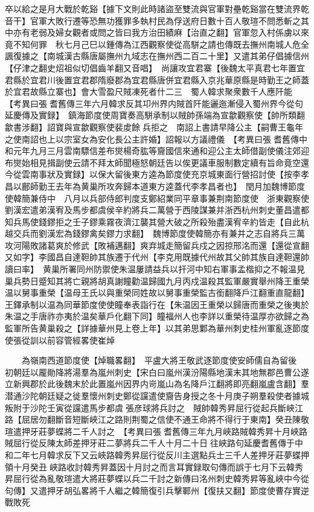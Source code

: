 卒以給之是月大戰於乾谿【據下文則此時諸盜至雙流與官軍對壘乾谿當在雙流界乾音干】官軍大敗行遷等恐無功獲罪多執村民為俘送府日數十百人敬瑄不問悉斬之其中亦有老弱及婦女觀者或問之皆曰我方治田績麻【治直之翻】官軍忽入村係虜以來竟不知何罪　秋七月己巳以鍾傳為江西觀察使從高駢之請也傳既去撫州南城人危全諷復據之【南城漢古縣唐屬撫州九域志在撫州西二百二十里】又遣其弟仔倡據信州【仔津之翻史炤祖似切倡齒羊翻又音唱】　尚讓攻宜君寨【後魏太平真君七年置宜君縣於宜君川後置宜君郡隋廢郡為宜君縣唐併宜君縣入京兆華原縣是時勤王之師蓋於宜君故縣立寨也】會大雪盈尺賊凍死者什二三　蜀人韓求聚衆數千人應阡能　【考異曰張耆舊傳三年六月韓求反其卭州界内賊首阡能邐迤漸侵入蜀州界今從句延慶傳及實録】　鎮海節度使周寶奏高駢承制以賊帥孫端為宣歙觀察使【帥所類翻歙書涉翻】詔寶與宣歙觀察使裴䖍餘兵拒之　南詔上書請早降公主【嗣曹王龜年之使南詔也上以宗室女為安化長公主許婚】詔報以方議禮儀　【考異曰張耆舊傳中和元年九月三月雲南驃信差布爕楊奇肱等齎國信來通和迎公主太師借副使儀注郊迎布爕始相見揖副使云請不拜太師聞極怒朝廷告以俟更議車服制數定續有旨命竟空還今從雲南事狀及實録】以保大留後東方逵為節度使充京城東面行營招討使【按李孝昌以鄜師勤王去年為黄巢所攻奔歸本道東方逵蓋代李孝昌者也】　閏月加魏博節度使韓簡兼侍中　八月以兵部侍郎判度支鄭紹業同平章事兼荆南節度使　浙東觀察使劉漢宏遣弟漢宥及馬步都虞侯辛約將兵二萬營于西陵謀兼并浙西杭州刺史董昌遣都知兵馬使錢鏐拒之壬子鏐乘霧夜濟江襲其營大破之所殺殆盡漢宥辛約皆走【自此杭越交兵而劉漢宏為錢鏐禽矣鏐力求翻】　魏博節度使韓簡亦有兼并之志自將兵三萬攻河陽敗諸葛爽於修武【敗補邁翻】爽弃城走簡留兵戍之因掠邢洺而還【還從宣翻又如字】李國昌自達靼帥其族遷于代州【李克用既據代州故其父帥其族自達靼還帥讀曰率】　黄巢所署同州防禦使朱温屢請益兵以扞河中知右軍事孟楷抑之不報温見巢兵勢日蹙知其將亡親將胡真謝瞳勸温歸國九月丙戍温殺其監軍嚴實舉州降王重榮温以舅事重榮【温母王氏以與重榮同姓故以舅事重榮監古銜翻降戶江翻重直龍翻】王鐸承制以温為同華節度使使瞳奉表詣行在【朱温因王重榮以歸唐而重榮之後夷於朱温之手唐祚亦夷於温矣華戶化翻下同】瞳福州人也李詳以重榮待温厚亦欲歸之為監軍所告黄巢殺之【詳據華州見上卷上年】以其弟思鄴為華州刺史桂州軍亂逐節度使張從訓以前容管經畧使崔焯

　　為嶺南西道節度使【焯職畧翻】　平盧大將王敬武逐節度使安師儒自為留後　初朝廷以龎勛降將湯羣為嵐州刺史【宋白曰嵐州漢汾陽縣地漢末其地無郡邑曹公遂立新興郡於此後魏末於此置嵐州因界内岢嵐山為名降戶江翻將即亮翻嵐盧含翻】羣潜通沙陀朝廷疑之徙羣懷州刺史鄭從讜遣使齎告身授之冬十月庚子朔羣殺使者據城叛附于沙陀壬寅從讜遣馬步都虞張彦球將兵討之　賊帥韓秀昇屈行從起兵斷峽江路【屈居勿翻斷音短斷峽江之路則荆蜀之信使不通王命將不得行于東南】癸丑陳敬瑄遣押牙莊夢蝶將二千人討之　【考異曰張耆舊傳三年九月峽路賊韓秀昇十月峽路賊屈行從反陳太師差押牙莊二夢將兵二千人十月二十日往峽路句延慶耆舊傳于中和二年七月韓求反下又云峽路韓秀昇屈行從反川主選點兵士三千人差押牙莊夢蝶押領十月癸丑峽路收討韓秀昇蓋因十月討之而言耳實録取句傳而誤于七月下云韓秀昇屈行從為亂敬瑄遣大將莊夢蝶以兵二千討之新傳曰洺州刺史韓秀昇等亂峽中今從句傳】又遣押牙胡弘畧將千人繼之韓簡復引兵擊鄆州【復扶又翻】節度使曹存實逆戰敗死

